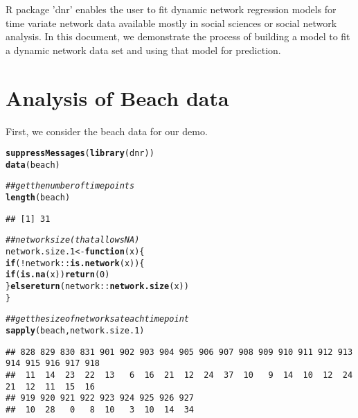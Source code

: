 \documentclass[12pt]{article}\usepackage[]{graphicx}\usepackage[]{color}
\makeatletter
\newcommand{\hlnum}[1]{\textcolor[rgb]{0.686,0.059,0.569}{#1}}%
\newcommand{\hlcom}[1]{\textcolor[rgb]{0.678,0.584,0.686}{\textit{#1}}}%
\newcommand{\hlopt}[1]{\textcolor[rgb]{0,0,0}{#1}}%
\newcommand{\hlstd}[1]{\textcolor[rgb]{0.345,0.345,0.345}{#1}}%
\newcommand{\hlkwa}[1]{\textcolor[rgb]{0.161,0.373,0.58}{\textbf{#1}}}%
\newcommand{\hlkwb}[1]{\textcolor[rgb]{0.69,0.353,0.396}{#1}}%
\newcommand{\hlkwc}[1]{\textcolor[rgb]{0.333,0.667,0.333}{#1}}%
\newcommand{\hlkwd}[1]{\textcolor[rgb]{0.737,0.353,0.396}{\textbf{#1}}}%
\newenvironment{kframe}{%
 \def\at@end@of@kframe{}%
 \ifinner\ifhmode%
  \def\at@end@of@kframe{\end{minipage}}%
  \begin{minipage}{\columnwidth}%
 \fi\fi%
 \def\FrameCommand##1{\hskip\@totalleftmargin \hskip-\fboxsep
 \colorbox{shadecolor}{##1}\hskip-\fboxsep
     \hskip-\linewidth \hskip-\@totalleftmargin \hskip\columnwidth}%
 \MakeFramed {\advance\hsize-\width
   \@totalleftmargin\z@ \linewidth\hsize
   \@setminipage}}%
 {\par\unskip\endMakeFramed%
 \at@end@of@kframe}
\newenvironment{knitrout}{}{} %
\makeatother
\begin{document}
\newcommand\myeq{\mathrel{\stackrel{\makebox[0pt]{\mbox{\normalfont\tiny def}}}{=}}}



\maketitle

R package 'dnr' enables the user to fit dynamic network regression models for time variate network data available mostly in social sciences or social network analysis. In this document, we demonstrate the process of building a model to fit a dynamic network data set and using that model for prediction.

\section{Analysis of Beach data}
\label{sec:analysis-beach-data}

First, we consider the beach data for our demo.



\begin{knitrout}
\color{fgcolor}\begin{kframe}
\begin{alltt}
\hlkwd{suppressMessages}\hlstd{(}\hlkwd{library}\hlstd{(dnr))}
\hlkwd{data}\hlstd{(beach)}

\hlcom{## get the number of time points}
\hlkwd{length}\hlstd{(beach)}
\end{alltt}
\begin{verbatim}
## [1] 31
\end{verbatim}
\begin{alltt}
\hlcom{## network size (that allows NA)}
\hlstd{network.size.1} \hlkwb{<-} \hlkwa{function}\hlstd{(}\hlkwc{x}\hlstd{)\{}
  \hlkwa{if}\hlstd{(}\hlopt{!}\hlstd{network}\hlopt{::}\hlkwd{is.network}\hlstd{(x))\{}
    \hlkwa{if}\hlstd{(}\hlkwd{is.na}\hlstd{(x))} \hlkwd{return}\hlstd{(}\hlnum{0}\hlstd{)}
  \hlstd{\}} \hlkwa{else} \hlkwd{return}\hlstd{(network}\hlopt{::}\hlkwd{network.size}\hlstd{(x))}
\hlstd{\}}

\hlcom{## get the size of networks at each time point}
\hlkwd{sapply}\hlstd{(beach, network.size.1)}
\end{alltt}
\begin{verbatim}
## 828 829 830 831 901 902 903 904 905 906 907 908 909 910 911 912 913 914 915 916 917 918 
##  11  14  23  22  13   6  16  21  12  24  37  10   9  14  10  12  24  21  12  11  15  16 
## 919 920 921 922 923 924 925 926 927 
##  10  28   0   8  10   3  10  14  34
\end{verbatim}
\end{kframe}
\end{knitrout}
\end{document}
